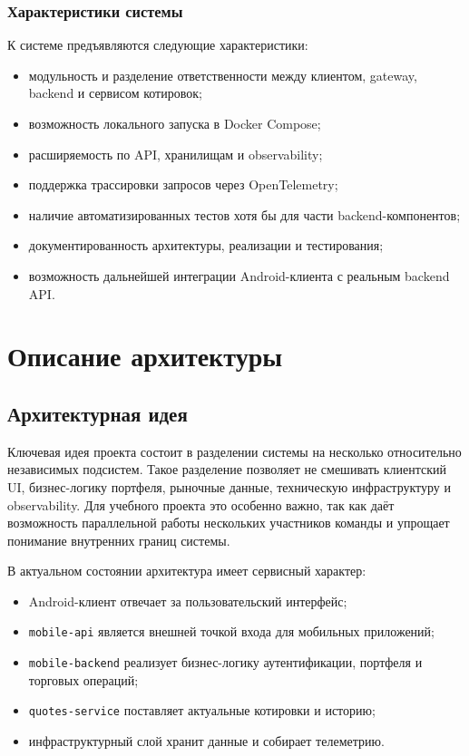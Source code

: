 \documentclass[12pt,a4paper]{article}
\begin{document}
\subsubsection{Характеристики системы}

К системе предъявляются следующие характеристики:

\begin{itemize}[leftmargin=1.2cm]
    \item модульность и разделение ответственности между клиентом, gateway, backend и сервисом котировок;
    \item возможность локального запуска в Docker Compose;
    \item расширяемость по API, хранилищам и observability;
    \item поддержка трассировки запросов через OpenTelemetry;
    \item наличие автоматизированных тестов хотя бы для части backend-компонентов;
    \item документированность архитектуры, реализации и тестирования;
    \item возможность дальнейшей интеграции Android-клиента с реальным backend API.
\end{itemize}

\section{Описание архитектуры}

\subsection{Архитектурная идея}

Ключевая идея проекта состоит в разделении системы на несколько относительно независимых подсистем. Такое разделение позволяет не смешивать клиентский UI, бизнес-логику портфеля, рыночные данные, техническую инфраструктуру и observability. Для учебного проекта это особенно важно, так как даёт возможность параллельной работы нескольких участников команды и упрощает понимание внутренних границ системы.

В актуальном состоянии архитектура имеет сервисный характер:

\begin{itemize}[leftmargin=1.2cm]
    \item Android-клиент отвечает за пользовательский интерфейс;
    \item \texttt{mobile-api} является внешней точкой входа для мобильных приложений;
    \item \texttt{mobile-backend} реализует бизнес-логику аутентификации, портфеля и торговых операций;
    \item \texttt{quotes-service} поставляет актуальные котировки и историю;
    \item инфраструктурный слой хранит данные и собирает телеметрию.
\end{itemize}
\end{document}
